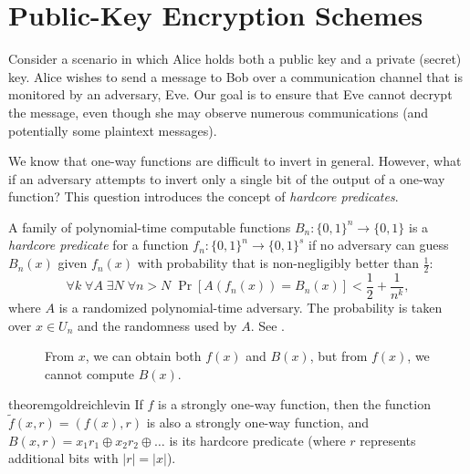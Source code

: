 
\section{Public-Key Encryption Schemes}

Consider a scenario in which Alice holds both a public key and a private (secret) key.
Alice wishes to send a message to Bob over a communication channel that is monitored by an adversary, Eve.
Our goal is to ensure that Eve cannot decrypt the message, even though she may observe numerous communications (and potentially some plaintext messages).

We know that one-way functions are difficult to invert in general.
However, what if an adversary attempts to invert only a single bit of the output of a one-way function?
This question introduces the concept of \emph{hardcore predicates}.

\begin{definition}
    A family of polynomial-time computable functions $B_n \colon \{0, 1\}^n \to \{0, 1\}$ is a \emph{hardcore predicate} for a function $f_n \colon \{0, 1\}^n \to \{0, 1\}^s$ if no adversary can guess $B_n(x)$ given $f_n(x)$ with probability that is non-negligibly better than $\frac{1}{2}$:
    \[
        \forall k \; \forall A \; \exists N \; \forall n > N \; \Pr[A(f_n(x)) = B_n(x)] < \frac{1}{2} + \frac{1}{n^{k}},
    \]
    where $A$ is a randomized polynomial-time adversary.
    The probability is taken over $x \in U_n$ and the randomness used by $A$.
    See .
    
    \begin{figure}[H]
        \centering
        \caption{From $x$, we can obtain both $f(x)$ and $B(x)$, but from $f(x)$, we cannot compute $B(x)$.}
        \label{fig:hardcore_predicate}
    \end{figure}
\end{definition}

\begin{restatable}{theorem}{goldreichlevin} \label{thm:goldreich_levin}
	If $f$ is a strongly one-way function, then the function $\tilde{f}(x, r) = (f(x), r)$ is also a strongly one-way function, and $B(x, r) = x_1 r_1 \oplus x_2 r_2 \oplus \dots$ is its hardcore predicate (where $r$ represents additional bits with $|r| = |x|$).
\end{restatable}

